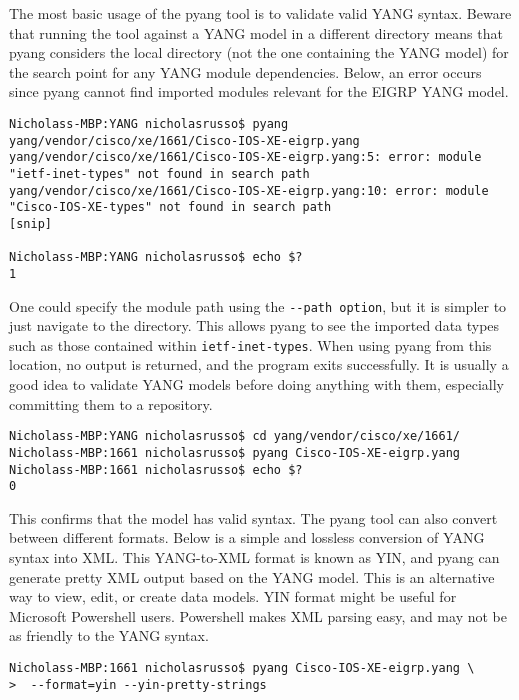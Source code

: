 The most basic usage of the pyang tool is to validate valid YANG syntax.
Beware that running the tool against a YANG model in a different directory
means that pyang considers the local directory (not the one containing the
YANG model) for the search point for any YANG module dependencies. Below, an
error occurs since pyang cannot find imported modules relevant for the EIGRP
YANG model.

\begin{verbatim}
Nicholass-MBP:YANG nicholasrusso$ pyang yang/vendor/cisco/xe/1661/Cisco-IOS-XE-eigrp.yang 
yang/vendor/cisco/xe/1661/Cisco-IOS-XE-eigrp.yang:5: error: module
"ietf-inet-types" not found in search path
yang/vendor/cisco/xe/1661/Cisco-IOS-XE-eigrp.yang:10: error: module
"Cisco-IOS-XE-types" not found in search path
[snip]

Nicholass-MBP:YANG nicholasrusso$ echo $?
1
\end{verbatim}

One could specify the module path using the \verb|--path option|, but it is
simpler to just navigate to the directory. This allows pyang to see the
imported data types such as those contained within \verb|ietf-inet-types|. When
using pyang from this location, no output is returned, and the program exits
successfully. It is usually a good idea to validate YANG models before doing
anything with them, especially committing them to a repository.

\begin{verbatim}
Nicholass-MBP:YANG nicholasrusso$ cd yang/vendor/cisco/xe/1661/
Nicholass-MBP:1661 nicholasrusso$ pyang Cisco-IOS-XE-eigrp.yang
Nicholass-MBP:1661 nicholasrusso$ echo $?
0
\end{verbatim}

This confirms that the model has valid syntax. The pyang tool can also convert
between different formats. Below is a simple and lossless conversion of YANG
syntax into XML. This YANG-to-XML format is known as YIN, and pyang can
generate pretty XML output based on the YANG model. This is an alternative way
to view, edit, or create data models. YIN format might be useful for Microsoft
Powershell users. Powershell makes XML parsing easy, and may not be as
friendly to the YANG syntax.

\begin{verbatim}
Nicholass-MBP:1661 nicholasrusso$ pyang Cisco-IOS-XE-eigrp.yang \
>  --format=yin --yin-pretty-strings
\end{verbatim}

